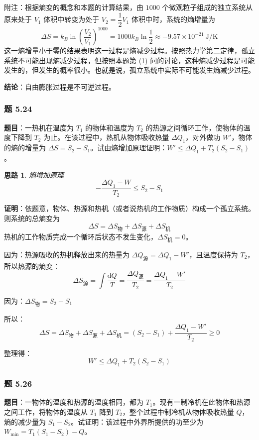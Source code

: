 \documentclass[UTF8]{ctexart}
\newtheorem{thoughts}{思路}[subsection]
\begin{document}
附注：根据熵变的概念和本题的计算结果，由 $1000$ 个微观粒子组成的独立系统从原来处于 $V_1$ 体积中转变为处于 $V_2=\dfrac{1}{2}V_1$ 体积中时，系统的熵增量为
\[
\Delta S=k_B\ln\left(\frac{V_2}{V_1}\right)^{1000}
=1000k_B\ln\frac{1}{2}
\approx -9.57\times 10^{-21}\ \mathrm{J/K}
\]
这一熵增量小于零的结果表明这一过程是熵减少过程。按照热力学第二定律，孤立系统不可能出现熵减少过程，但按照本题第 (1) 问的讨论，这种熵减少过程是可能发生的，但发生的概率很小。也就是说，孤立系统中实际不可能发生熵减少过程。

\textbf{结论}：自由膨胀过程是不可逆过程。


\subsubsection{题 5.24}

\textbf{题目}：一热机在温度为 $T_1$ 的物体和温度为 $T_2$ 的热源之间循环工作，使物体的温度下降到 $T_2$ 为止。在该过程中，热机从物体吸收热量 $\Delta Q_1$，对外做功 $W'$，物体的熵的增量为 $\Delta S=S_2-S_1$。试由熵增加原理证明：$W'\le \Delta Q_1+T_2(S_2-S_1)$。

\begin{thoughts}
  熵增加原理$$-\frac{\Delta Q_1-W}{T_2} \leq S_2 - S_1$$
\end{thoughts}

\textbf{证明}：依题意，物体、热源和热机（或者说热机的工作物质）构成一个孤立系统。则系统的总熵变为
\[
\Delta S=\Delta S_{\text{物}}+\Delta S_{\text{源}}+\Delta S_{\text{机}}
\]
热机的工作物质完成一个循环后状态不发生变化，$\Delta S_{\text{机}}=0$。

因为：热源吸收的热机释放出来的热量为 $\Delta Q_{\text{源}}=\Delta Q_1-W'$，且温度保持为 $T_2$，所以热源的熵变：
\[
\Delta S_{\text{源}}=\int\frac{\mathrm{d}Q}{T}=\frac{\Delta Q_{\text{源}}}{T_2}
=\frac{\Delta Q_1-W'}{T_2}
\]

因为：$\Delta S_{\text{物}}=S_2-S_1$

所以：
\[
\Delta S=\Delta S_{\text{物}}+\Delta S_{\text{源}}+\Delta S_{\text{机}}
=(S_2-S_1)+\frac{\Delta Q_1-W'}{T_2}\ge 0
\]

整理得：
\[
\boxed{W'\le \Delta Q_1+T_2(S_2-S_1)}
\]

\subsubsection{题 5.26}

\textbf{题目}：一物体的温度和热源的温度相同，都为 $T_1$。现有一制冷机在此物体和热源之间工作，将物体的温度从 $T_1$ 降到 $T_2$，整个过程中制冷机从物体吸收热量 $Q$，熵的减少量为 $S_1-S_2$。试证明：该过程中外界所提供的功至少为 $W_{\min}=T_1(S_1-S_2)-Q$。
\end{document}
